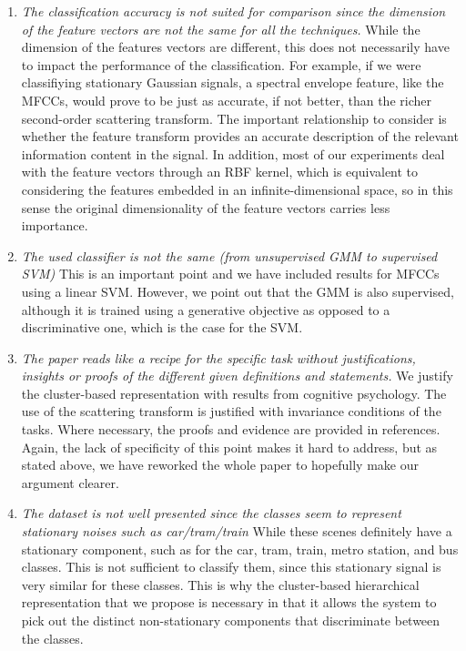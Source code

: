 \documentclass[10pt]{article}
\begin{document}
\begin{enumerate}
\item \emph{The classification accuracy is not suited for comparison since the dimension of the feature vectors are not the same for all the techniques.}
While the dimension of the features vectors are different, this does not necessarily have to impact the performance of the classification. For example, if we were classifiying stationary Gaussian signals, a spectral envelope feature, like the MFCCs, would prove to be just as accurate, if not better, than the richer second-order scattering transform. The important relationship to consider is whether the feature transform provides an accurate description of the relevant information content in the signal. In addition, most of our experiments deal with the feature vectors through an RBF kernel, which is equivalent to considering the features embedded in an infinite-dimensional space, so in this sense the original dimensionality of the feature vectors carries less importance.

\item \emph{The used classifier is not the same (from unsupervised GMM to supervised SVM)}
This is an important point and we have included results for MFCCs using a linear SVM. However, we point out that the GMM is also supervised, although it is trained using a generative objective as opposed to a discriminative one, which is the case for the SVM.

\item \emph{The paper reads like a recipe for the specific task without justifications, insights or proofs of the different given definitions and statements.}
We justify the cluster-based representation with results from cognitive psychology. The use of the scattering transform is justified with invariance conditions of the tasks. Where necessary, the proofs and evidence are provided in references. Again, the lack of specificity of this point makes it hard to address, but as stated above, we have reworked the whole paper to hopefully make our argument clearer.

\item \emph{The dataset is not well presented since the classes seem to represent stationary noises such as car/tram/train}
While these scenes definitely have a stationary component, such as for the car, tram, train, metro station, and bus classes. This is not sufficient to classify them, since this stationary signal is very similar for these classes. This is why the cluster-based hierarchical representation that we propose is necessary in that it allows the system to pick out the distinct non-stationary components that discriminate between the classes.


\end{enumerate}
\end{document}

